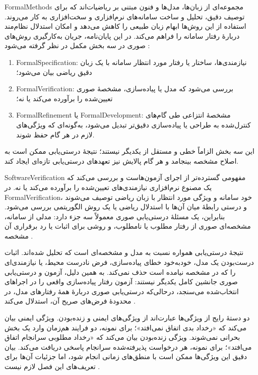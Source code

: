 \glspl{FormalMethod} مجموعه‌ای از زبان‌ها، مدل‌ها و فنون مبتنی بر ریاضیات‌اند که برای توصیف دقیق، تحلیل و ساخت سامانه‌های نرم‌افزاری و سخت‌افزاری به کار می‌روند. استفاده از این روش‌ها ابهام زبان طبیعی را کاهش می‌دهد و امکان استدلال نظام‌مند دربارهٔ رفتار سامانه را فراهم می‌کند. در این پایان‌نامه، جریان به‌کارگیری روش‌های صوری در سه بخش مکمل در نظر گرفته می‌شود \cite{ClarkeGrumbergPeled1999,BaierKatoen2008,Sirjani2004Thesis}:
\begin{enumerate}
\item \gls{FormalSpecification}: نیازمندی‌ها، ساختار یا رفتار مورد انتظار سامانه با یک زبان دقیق ریاضی بیان می‌شود؛
\item \gls{FormalVerification}: بررسی می‌شود که مدل یا پیاده‌سازی، مشخصهٔ صوری تعیین‌شده را برآورده می‌کند یا نه؛
\item \gls{FormalRefinement} یا \gls{FormalDevelopment}: مشخصهٔ انتزاعی طی گام‌های کنترل‌شده به طراحی یا پیاده‌سازی دقیق‌تر تبدیل می‌شود، به‌گونه‌ای که ویژگی‌های لازم در هر گام حفظ شوند.
\end{enumerate}
این سه بخش الزاماً خطی و مستقل از یکدیگر نیستند؛ نتیجهٔ درستی‌یابی ممکن است به اصلاح مشخصه بینجامد و هر گام پالایش نیز تعهدهای درستی‌یابی تازه‌ای ایجاد کند.

\gls{SoftwareVerification} مفهومی گسترده‌تر از اجرای آزمون‌هاست و بررسی می‌کند که یک مصنوع نرم‌افزاری نیازمندی‌های تعیین‌شده را برآورده می‌کند یا نه. در \gls{FormalVerification}، خود سامانه و ویژگی مورد انتظار با زبان ریاضی توصیف می‌شوند و درستی رابطهٔ میان آن‌ها با استدلال ریاضی یا یک روش الگوریتمی بررسی می‌شود. بنابراین، یک مسئلهٔ درستی‌یابی صوری معمولاً سه جزء دارد: مدلی از سامانه، مشخصه‌ای صوری از رفتار مطلوب یا نامطلوب، و روشی برای اثبات یا رد برقراری آن مشخصه \cite{ClarkeGrumbergPeled1999,SirjaniEtAl2004Rebeca}.

نتیجهٔ درستی‌یابی همواره نسبت به مدل و مشخصه‌ای است که تحلیل شده‌اند. اثبات درست‌بودن یک مدل، خودبه‌خود خطای پیاده‌سازی، فرض نادرست محیط، یا نیازمندی‌ای را که در مشخصه نیامده است حذف نمی‌کند. به همین دلیل، آزمون و درستی‌یابی صوری جانشین کامل یکدیگر نیستند: آزمون رفتار پیاده‌سازی واقعی را در اجراهای انتخاب‌شده می‌سنجد، درحالی‌که درستی‌یابی صوری دربارهٔ همهٔ رفتارهای مدل، در محدودهٔ فرض‌های صریح آن، استدلال می‌کند \cite{BaierKatoen2008}.

دو دستهٔ رایج از ویژگی‌ها عبارت‌اند از ویژگی‌های ایمنی و زنده‌بودن. ویژگی ایمنی بیان می‌کند که «رخداد بدی اتفاق نمی‌افتد»؛ برای نمونه، دو فرایند هم‌زمان وارد یک بخش بحرانی نمی‌شوند. ویژگی زنده‌بودن بیان می‌کند که «رخداد مطلوبی سرانجام اتفاق می‌افتد»؛ برای نمونه، هر درخواست پذیرفته‌شده سرانجام پاسخی دریافت می‌کند. بیان دقیق این ویژگی‌ها ممکن است با منطق‌های زمانی انجام شود، اما جزئیات آن‌ها برای تعریف‌های این فصل لازم نیست \cite{BaierKatoen2008}.

